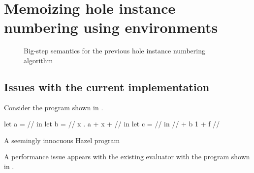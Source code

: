 \section{Memoizing hole instance numbering using environments}
\label{sec:renumbering}

\begin{singlespace}
  \begin{figure}
    \centering
    \begin{subfigure}{\textwidth}
      \begin{mdframed}[bottomline=false]
        
      \end{mdframed}
    \end{subfigure}
  \end{figure}
  \begin{figure}
    \ContinuedFloat
    \begin{subfigure}{\textwidth}
      \begin{mdframed}[topline=false]
        
      \end{mdframed}
    \end{subfigure}
    \caption{Big-step semantics for the previous hole instance numbering algorithm}
    \label{fig:small-step-formal}
  \end{figure}
\end{singlespace}

\subsection{Issues with the current implementation}
\label{sec:current_problems}

Consider the program shown in .

\begin{listing}
  \centering
  \begin{hminted}
let a = // in
let b = /\lbd/ x . { a + x + // } in
let c = // in
// + b 1 + f //
  \end{hminted}
  \caption{A seemingly innocuous Hazel program}
  \label{fig:sample_hazel_program}
\end{listing}

A performance issue appears with the existing evaluator with the program shown in .



